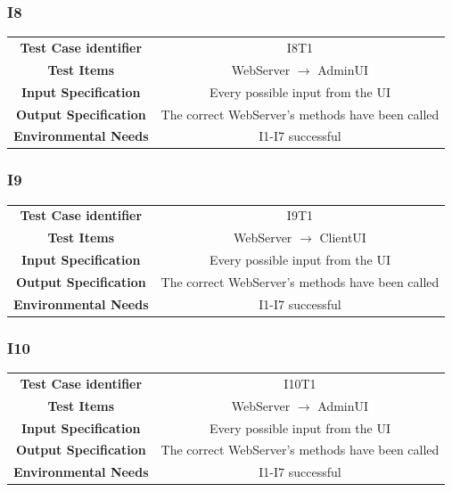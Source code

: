 \documentclass{article}
\begin{document}
\subsubsection{I8}
\begin{adjustbox}{width=1.2\textwidth}	
	\begin{tabular}{*{2}{c}}
		\toprule
		\textbf{Test Case identifier} & I8T1\\
		\textbf{Test Items} & WebServer $\rightarrow$ AdminUI\\
		\textbf{Input Specification} & Every possible input from the UI\\ 
		\textbf{Output Specification} & The correct WebServer's methods have been called\\
		\textbf{Environmental Needs} & I1-I7 successful\\
		\bottomrule
	\end{tabular}
\end{adjustbox}
\subsubsection{I9}
\begin{adjustbox}{width=1.2\textwidth}	
	\begin{tabular}{*{2}{c}}
		\toprule
		\textbf{Test Case identifier} & I9T1\\
		\textbf{Test Items} & WebServer $\rightarrow$ ClientUI\\
		\textbf{Input Specification} & Every possible input from the UI\\ 
		\textbf{Output Specification} & The correct WebServer's methods have been called\\
		\textbf{Environmental Needs} & I1-I7 successful\\
		\bottomrule
	\end{tabular}
\end{adjustbox}
\subsubsection{I10}
\begin{adjustbox}{width=1.2\textwidth}	
	\begin{tabular}{*{2}{c}}
		\toprule
		\textbf{Test Case identifier} & I10T1\\
		\textbf{Test Items} & WebServer $\rightarrow$ AdminUI\\
		\textbf{Input Specification} & Every possible input from the UI\\ 
		\textbf{Output Specification} & The correct WebServer's methods have been called\\
		\textbf{Environmental Needs} & I1-I7 successful\\
		\bottomrule
	\end{tabular}
\end{adjustbox}
\end{document}
